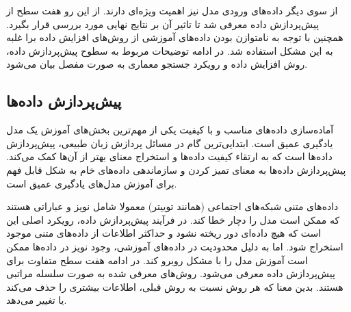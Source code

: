 از سوی دیگر داده‌های ورودی مدل نیز اهمیت ویژه‌ای دارند. از این رو هفت سطح از پیش‌پردازش داده معرفی شد تا تاثیر آن بر نتایج نهایی مورد بررسی قرار بگیرد. همچنین با توجه به نامتوازن بودن داده‌های آموزشی از  روش‌های افزایش داده برا غلبه به این مشکل استفاده شد.
در ادامه توضیحات مربوط به سطوح پیش‌پردازش داده، روش افزایش داده و رویکرد جستجو معماری به صورت مفصل بیان می‌شود.

\subsection{پیش‌پردازش داده‌ها}\label{sec:preprocess}
آماده‌سازی داده‌های مناسب و با کیفیت یکی از مهم‌ترین بخش‌های آموزش یک مدل یادگیری عمیق است.
ابتدایی‌ترین گام در مسائل پردازش زبان طبیعی، پیش‌پردازش دادە‌ها است که به ارتقاء کیفیت دادە‌ها و استخراج معنای بهتر از آن‌ها کمک می‌کند. پیش‌پردازش دادە‌ها به معنای تمیز کردن و سازماندهی دادە‌های خام به شکل قابل فهم برای آموزش مدل‌های یادگیری عمیق است.

 داده‌های متنی شبکه‌های اجتماعی (همانند توییتر) معمولا شامل نویز و عباراتی هستند که ممکن است مدل را دچار خطا کند. در فرآیند پیش‌پردازش داده‌، رویکرد اصلی این است که هیچ داده‌‌ای دور ریخته نشود و حداکثر اطلاعات از داده‌های متنی موجود استخراج شود. اما به دلیل محدودیت در داده‌های آموزشی، وجود نویز در داده‌ها ممکن است آموزش مدل را با مشکل روبرو کند. در ادامه هفت سطح متفاوت برای پیش‌پردازش داده معرفی می‌شود. روش‌های معرفی شده به صورت سلسله مراتبی هستند. بدین معنا که هر روش نسبت به روش قبلی، اطلاعات بیشتری را حذف می‌کند یا تغییر می‌دهد.
 
